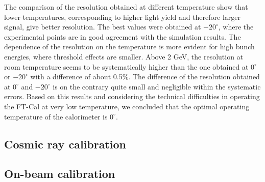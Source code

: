 The comparison of the resolution obtained at different temperature
show that lower temperatures, corresponding to higher light yield and
therefore larger signal, give better resolution. The best values were
obtained at $-20^{\circ}$, where the experimental points are in good
agreement with the simulation results. The dependence of the
resolution on the temperature is more evident for high bunch energies,
where threshold effects are smaller. Above 2 GeV, the resolution at
room temperature seems to be systematically higher than the one
obtained at $0^\circ$ or $-20^\circ$ with a difference of about
0.5\%. The difference of the resolution obtained at $0^\circ$ and $-20^\circ$ 
is on the contrary quite small and negligible within the systematic
errors. Based on this results and considering the technical
difficulties in operating the FT-Cal at very low temperature, we
concluded that the optimal operating temperature of the calorimeter is
$0^\circ$.

\subsection{Cosmic ray calibration}
\subsection{On-beam calibration}
